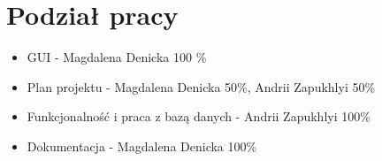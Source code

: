 \documentclass[a4paper,12pt]{article}
\begin{document}
	\section{Podział pracy}
	\begin{itemize}
		\item 	GUI - Magdalena Denicka 100 \%
		\item Plan projektu - Magdalena Denicka 50\%, Andrii Zapukhlyi 50\%
		\item Funkcjonalność i praca z bazą danych - Andrii Zapukhlyi 100\%
		\item Dokumentacja - Magdalena Denicka 100\%
	\end{itemize}

	\listoffigures
	
\end{document}
